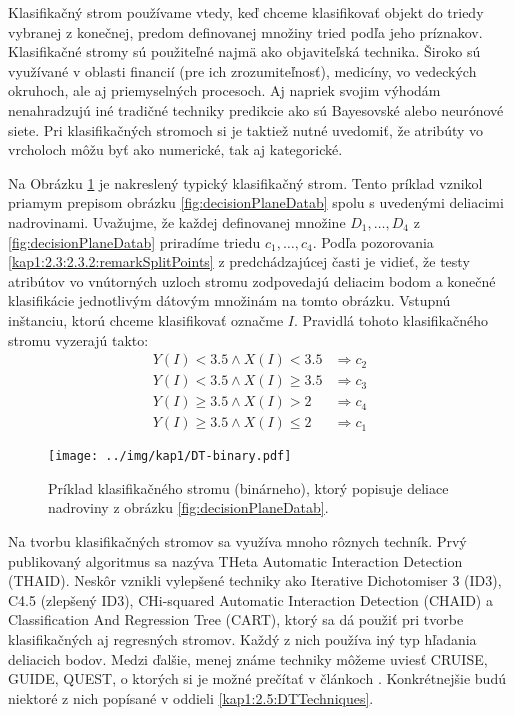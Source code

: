 Klasifikačný strom používame vtedy, keď chceme klasifikovať objekt do triedy vybranej z konečnej, predom definovanej množiny tried podľa jeho príznakov. Klasifikačné stromy sú použiteľné najmä ako objaviteľská technika. Široko sú využívané v oblasti financií (pre ich zrozumiteľnosť), medicíny, vo vedeckých okruhoch, ale aj priemyselných procesoch. Aj napriek svojim výhodám nenahradzujú iné tradičné techniky predikcie ako sú Bayesovské alebo neurónové siete. Pri klasifikačných stromoch si je taktiež nutné uvedomiť, že atribúty vo vrcholoch môžu byť ako numerické, tak aj kategorické.

Na Obrázku \ref{fig:TypesClassify} je nakreslený typický klasifikačný strom. Tento príklad vznikol priamym prepisom obrázku \ref{fig:decisionPlaneDatab} spolu s uvedenými deliacimi nadrovinami. Uvažujme, že každej definovanej množine $D_{1},\ldots,D_{4}$ z \ref{fig:decisionPlaneDatab} priradíme triedu $c_{1},\ldots,c_{4}$. Podľa pozorovania \ref{kap1:2.3:2.3.2:remarkSplitPoints} z predchádzajúcej časti je vidieť, že testy atribútov vo vnútorných uzloch stromu zodpovedajú deliacim bodom a konečné klasifikácie jednotlivým dátovým množinám na tomto obrázku. Vstupnú inštanciu, ktorú chceme klasifikovať označme $I$. Pravidlá tohoto klasifikačného stromu vyzerajú takto:
\begin{align}
Y(I) < 3.5 \wedge X(I) < 3.5 &\Rightarrow c_{2} \nonumber \\
Y(I) < 3.5 \wedge X(I) \geq 3.5 &\Rightarrow c_{3} \nonumber \\
Y(I) \geq 3.5 \wedge X(I) > 2 &\Rightarrow c_{4} \nonumber \\
Y(I) \geq 3.5 \wedge X(I) \leq 2 &\Rightarrow c_{1} \nonumber
\end{align}
\begin{figure}[h]
\centering
\centerline{\mbox{\texttt{[image: ../img/kap1/DT-binary.pdf]}}}
\caption{Príklad klasifikačného stromu (binárneho), ktorý popisuje deliace nadroviny z obrázku \ref{fig:decisionPlaneDatab}.}\label{fig:TypesClassify}
\end{figure}
Na tvorbu klasifikačných stromov sa využíva mnoho rôznych techník. 
Prvý publikovaný algoritmus sa nazýva THeta Automatic Interaction Detection (THAID). Neskôr vznikli vylepšené techniky ako Iterative Dichotomiser 3 (ID3), C4.5 (zlepšený ID3), CHi-squared Automatic Interaction Detection (CHAID) a Classification And Regression Tree (CART), ktorý sa dá použiť pri tvorbe klasifikačných aj regresných stromov. Každý z nich používa iný typ hľadania deliacich bodov. Medzi ďalšie, menej známe techniky môžeme uviesť CRUISE, GUIDE, QUEST, o ktorých si je možné prečítať v článkoch \cite{kap1-DecisionTreesUnused1,kap1-DecisionTreesUnused2,kap1-DecisionTreesUnused3}.
Konkrétnejšie budú niektoré z nich popísané v oddieli \ref{kap1:2.5:DTTechniques}. 


